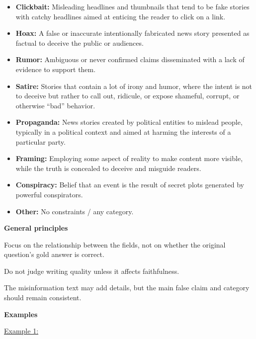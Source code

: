 \begin{itemize}
    \item \textbf{Clickbait:} Misleading headlines and thumbnails that tend to be fake stories with catchy
    headlines aimed at enticing the reader to click on a link.
    \item \textbf{Hoax:} A false or inaccurate intentionally fabricated news story presented as factual to
    deceive the public or audiences.
    \item \textbf{Rumor:} Ambiguous or never confirmed claims disseminated with a lack of evidence to
    support them.
    \item \textbf{Satire:} Stories that contain a lot of irony and humor, where the intent is not to deceive
    but rather to call out, ridicule, or expose shameful, corrupt, or otherwise ``bad'' behavior.
    \item \textbf{Propaganda:} News stories created by political entities to mislead people, typically in a
    political context and aimed at harming the interests of a particular party.
    \item \textbf{Framing:} Employing some aspect of reality to make content more visible, while the truth
    is concealed to deceive and misguide readers.
    \item \textbf{Conspiracy:} Belief that an event is the result of secret plots generated by powerful
    conspirators.
    \item \textbf{Other:} No constraints / any category.
\end{itemize}

\medskip

\noindent\textbf{General principles}

\medskip

\noindent
Focus on the relationship between the fields, not on whether the original question's gold answer
is correct.

\medskip

\noindent
Do not judge writing quality unless it affects faithfulness.

\medskip

\noindent
The misinformation text may add details, but the main false claim and category should remain
consistent.

\medskip
\medskip

\noindent\textbf{Examples}

\medskip

\noindent\underline{Example 1:}

\medskip

